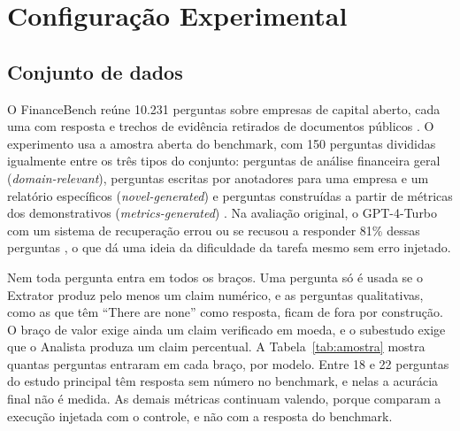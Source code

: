 \section{Configuração Experimental}\label{sec:configuracao}

\subsection{Conjunto de dados}\label{sec:dados}

O FinanceBench reúne 10.231 perguntas sobre empresas de capital aberto, cada uma com resposta e trechos de evidência retirados de documentos públicos \cite{islam2023financebench}.
O experimento usa a amostra aberta do benchmark, com 150 perguntas divididas igualmente entre os três tipos do conjunto: perguntas de análise financeira geral (\emph{domain-relevant}), perguntas escritas por anotadores para uma empresa e um relatório específicos (\emph{novel-generated}) e perguntas construídas a partir de métricas dos demonstrativos (\emph{metrics-generated}) \cite{islam2023financebench}.
Na avaliação original, o GPT-4-Turbo com um sistema de recuperação errou ou se recusou a responder 81\% dessas perguntas \cite{islam2023financebench}, o que dá uma ideia da dificuldade da tarefa mesmo sem erro injetado.

Nem toda pergunta entra em todos os braços.
Uma pergunta só é usada se o Extrator produz pelo menos um claim numérico, e as perguntas qualitativas, como as que têm ``There are none'' como resposta, ficam de fora por construção.
O braço de valor exige ainda um claim verificado em moeda, e o subestudo exige que o Analista produza um claim percentual.
A Tabela~\ref{tab:amostra} mostra quantas perguntas entraram em cada braço, por modelo.
Entre 18 e 22 perguntas do estudo principal têm resposta sem número no benchmark, e nelas a acurácia final não é medida. As demais métricas continuam valendo, porque comparam a execução injetada com o controle, e não com a resposta do benchmark.

